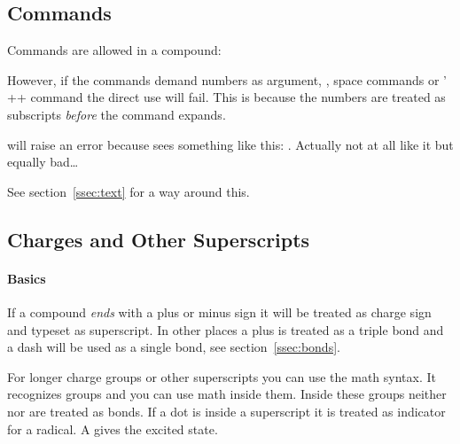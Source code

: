 \documentclass[load-preamble+]{cnltx-doc}
\begin{document}
\subsection{Commands}
Commands are allowed in a compound:
\begin{example}
   
\end{example}

However, if the commands demand numbers as argument, \eg, space commands or
\chemmacros' \verbcode+\ox+ command the direct use will fail.  This is
because the numbers are treated as subscripts \emph{before} the command
expands.
\begin{sourcecode}
   will raise an error because \hspace sees something like
  this: \hspace{$_2$mm}. Actually not at all like it but equally bad\ldots
\end{sourcecode}
See section~\ref{ssec:text} for a way around this.

\subsection{Charges and Other Superscripts}
\paragraph{Basics}
If a compound \emph{ends} with a plus or minus sign it will be treated as
charge sign and typeset as superscript.  In other places a plus is treated as
a triple bond and a dash will be used as a single bond, see
section~\ref{ssec:bonds}.
\begin{example}
    \par
   
\end{example}

For longer charge groups or other superscripts you can use the math syntax.
It recognizes groups and you can use math inside them.  Inside these groups
neither \code{+} nor \code{-} are treated as bonds.  If a dot  is
inside a superscript it is treated as indicator for a radical.  A \code{*}
gives the excited state.
\begin{example}
   \par
   \par
   \par
   \par
   \par
   \par
   \par
   \par
\end{example}
\end{document}
